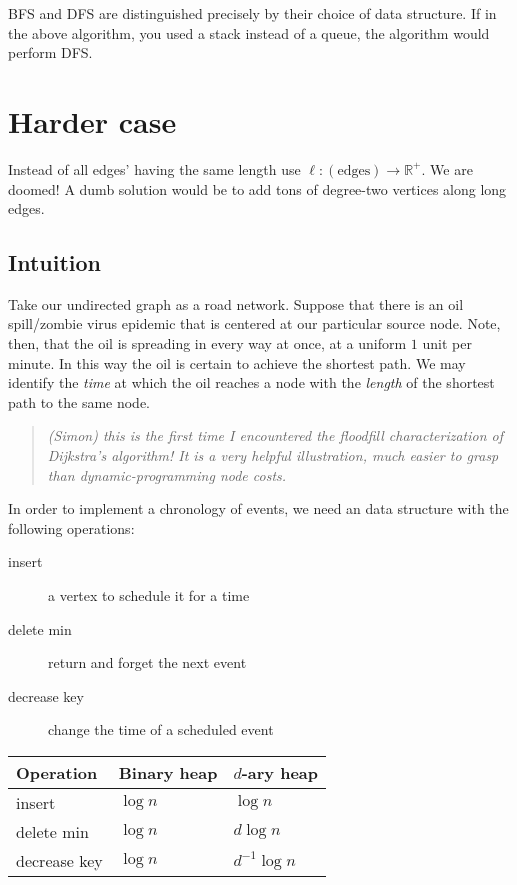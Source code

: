 BFS and DFS are distinguished precisely by their choice of data structure.
If in the above algorithm, you used a stack instead of a queue,
the algorithm would perform DFS.

\section{Harder case}
Instead of all edges' having the same length use \(\ell: \left(\text{edges}\right)\to \mathbb{R}^+\).
We are doomed! A dumb solution would be to add tons of degree-two vertices
along long edges.

\subsection{Intuition}
Take our undirected graph as a road network.
Suppose that there is an oil spill/zombie virus epidemic that is centered at our
particular source node.
Note, then, that the oil is spreading in every way at once, at a uniform
\(1\) unit per minute.
In this way the oil is certain to achieve the shortest path.
We may identify the \emph{time} at which the oil reaches a node with the
\emph{length} of the shortest path to the same node.

\begin{quote}
	\em
	(Simon) this is the first time I encountered the floodfill
	characterization of Dijkstra's algorithm! It is a very helpful illustration,
	much easier to grasp than dynamic-programming node costs.
\end{quote}

In order to implement a chronology of events, we need an data structure with
the following operations:
\begin{description}
	\item[insert] a vertex to schedule it for a time
	\item[delete min] return and forget the next event
	\item[decrease key] change the time of a scheduled event
\end{description}

\begin{tabular}{lll}
	Operation & Binary heap & \(d\)-ary heap \\\hline
	insert & \(\log n\) & \(\log n\) \\
	delete min & \(\log n\) & \(d \log n\)\\
	decrease key & \(\log n\) & \(d^{-1} \log n\)
\end{tabular}

